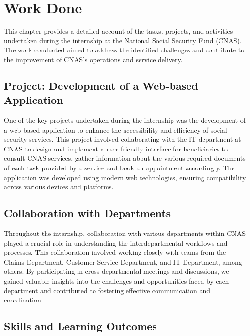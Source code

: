 \chapter{Work Done}
\label{chap:work-done}

This chapter provides a detailed account of the tasks, projects, and activities undertaken during the internship at the National Social Security Fund (CNAS). The work conducted aimed to address the identified challenges and contribute to the improvement of CNAS's operations and service delivery.

\section{Project: Development of a Web-based Application}
\label{sec:project1}

One of the key projects undertaken during the internship was the development of a web-based application to enhance the accessibility and efficiency of social security services. This project involved collaborating with the IT department at CNAS to design and implement a user-friendly interface for beneficiaries to consult CNAS services, gather information about the various required documents of each task provided by a service and book an appointment accordingly. The application was developed using modern web technologies, ensuring compatibility across various devices and platforms.

\section{Collaboration with Departments}
\label{sec:collaboration}

Throughout the internship, collaboration with various departments within CNAS played a crucial role in understanding the interdepartmental workflows and processes. This collaboration involved working closely with teams from the Claims Department, Customer Service Department, and IT Department, among others. By participating in cross-departmental meetings and discussions, we gained valuable insights into the challenges and opportunities faced by each department and contributed to fostering effective communication and coordination.

\section{Skills and Learning Outcomes}
\label{sec:learning-outcomes}

